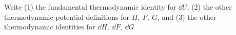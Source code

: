 

\vspace*{\fill}
\centering

Write (1) the fundamental thermodynamic identity for $\dd{U}$, (2) the other thermodynamic potential definitions for $H,~F,~G$, and (3) the other thermodynamic identities for $\dd{H},~\dd{F},~\dd{G}$

\centering
\vspace*{\fill}

